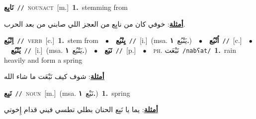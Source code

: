 \documentclass[10pt,a4paper,twoside]{article} %
\begin{document}
\begin{multicols}{2}
{{{{{{\setlength\topsep{0pt}\textbf{\foreignlanguage{arabic}{نَابِع}}\ {\color{gray}\texttt{//}\color{black}}\ \textsc{noun\textunderscore act}\ [m.]\ \textbf{1.}~stemming from\  \begin{flushright}\color{gray}\foreignlanguage{arabic}{\textbf{\underline{\foreignlanguage{arabic}{أمثلة}}}: خوفي كان من نابِع من العجز اللي صابني من بعد الحرب.}\end{flushright}\color{black}} \vspace{2mm}

{\setlength\topsep{0pt}\textbf{\foreignlanguage{arabic}{اِنْبُع}}\ {\color{gray}\texttt{//}\color{black}}\ \textsc{verb}\ [c.]\ \textbf{1.}~stem from\ \ $\bullet$\ \ \setlength\topsep{0pt}\textbf{\foreignlanguage{arabic}{يِنْبُع}}\ {\color{gray}\texttt{//}\color{black}}\ [i.]\ \color{gray}(msa. \foreignlanguage{arabic}{يَنْبُع}~\foreignlanguage{arabic}{\textbf{١.}})\color{black}\ \ $\bullet$\ \ \setlength\topsep{0pt}\textbf{\foreignlanguage{arabic}{اُنْبُع}}\ {\color{gray}\texttt{//}\color{black}}\ [c.]\ \ $\bullet$\ \ \setlength\topsep{0pt}\textbf{\foreignlanguage{arabic}{يُنْبُع}}\ {\color{gray}\texttt{//}\color{black}}\ [i.]\ \color{gray}(msa. \foreignlanguage{arabic}{يَنْبُع}~\foreignlanguage{arabic}{\textbf{١.}})\color{black}\ \ $\bullet$\ \ \setlength\topsep{0pt}\textbf{\foreignlanguage{arabic}{نَبَع}}\ {\color{gray}\texttt{//}\color{black}}\ [p.]\ \ $\bullet$\ \ \textsc{ph.} \color{gray} \foreignlanguage{arabic}{نَبْعَت}\color{black}\ {\color{gray}\texttt{/{\sffamily nabʕat}/}\color{black}}\ \textbf{1.}~rain heavily and form a spring\  \begin{flushright}\color{gray}\foreignlanguage{arabic}{\textbf{\underline{\foreignlanguage{arabic}{أمثلة}}}: شوف كيف نَبْعَت ما شاء الله}\end{flushright}\color{black}} \vspace{2mm}

{\setlength\topsep{0pt}\textbf{\foreignlanguage{arabic}{نَبِع}}\ {\color{gray}\texttt{//}\color{black}}\ \textsc{noun}\ [m.]\ \color{gray}(msa. \foreignlanguage{arabic}{نَبْع}~\foreignlanguage{arabic}{\textbf{١.}})\color{black}\ \textbf{1.}~spring\  \begin{flushright}\color{gray}\foreignlanguage{arabic}{\textbf{\underline{\foreignlanguage{arabic}{أمثلة}}}: يما يا نَبِع الحنان بطلي تطسي فيني قدام إِخوتي}\end{flushright}\color{black}} \vspace{2mm}

}}}}}
\end{multicols}
\end{document}
